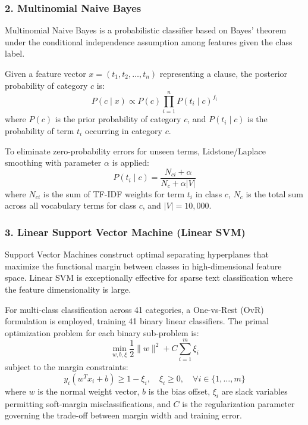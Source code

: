 \subsubsection*{2. Multinomial Naive Bayes}
Multinomial Naive Bayes is a probabilistic classifier based on Bayes' theorem under the conditional independence assumption among features given the class label.

Given a feature vector $x = (t_1, t_2, \dots, t_n)$ representing a clause, the posterior probability of category $c$ is:
\begin{equation}
    P(c \mid x) \propto P(c) \prod_{i=1}^{n} P(t_i \mid c)^{f_i}
\end{equation}
where $P(c)$ is the prior probability of category $c$, and $P(t_i \mid c)$ is the probability of term $t_i$ occurring in category $c$.

To eliminate zero-probability errors for unseen terms, Lidstone/Laplace smoothing with parameter $\alpha$ is applied:
\begin{equation}
    P(t_i \mid c) = \frac{N_{ci} + \alpha}{N_c + \alpha |V|}
\end{equation}
where $N_{ci}$ is the sum of TF-IDF weights for term $t_i$ in class $c$, $N_c$ is the total sum across all vocabulary terms for class $c$, and $|V| = 10,000$.

\subsubsection*{3. Linear Support Vector Machine (Linear SVM)}
Support Vector Machines construct optimal separating hyperplanes that maximize the functional margin between classes in high-dimensional feature space. Linear SVM is exceptionally effective for sparse text classification where the feature dimensionality is large.

For multi-class classification across 41 categories, a One-vs-Rest (OvR) formulation is employed, training 41 binary linear classifiers. The primal optimization problem for each binary sub-problem is:
\begin{equation}
    \min_{w, b, \xi} \frac{1}{2} \|w\|^2 + C \sum_{i=1}^{m} \xi_i
\end{equation}
subject to the margin constraints:
\begin{equation}
    y_i (w^T x_i + b) \ge 1 - \xi_i, \quad \xi_i \ge 0, \quad \forall i \in \{1, \dots, m\}
\end{equation}
where $w$ is the normal weight vector, $b$ is the bias offset, $\xi_i$ are slack variables permitting soft-margin misclassifications, and $C$ is the regularization parameter governing the trade-off between margin width and training error.

